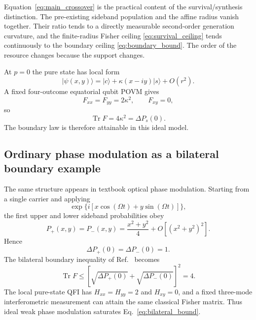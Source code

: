 \documentclass[aps,pra,reprint,superscriptaddress,longbibliography]{revtex4-2}
\newcommand{\Tr}{\operatorname{Tr}}
\begin{document}
Equation~\eqref{eq:main_crossover} is the practical content of the survival/synthesis distinction. The pre-existing sideband population and the affine radius vanish together. Their ratio tends to a directly measurable second-order generation curvature, and the finite-radius Fisher ceiling \eqref{eq:survival_ceiling} tends continuously to the boundary ceiling \eqref{eq:boundary_bound}. The order of the resource changes because the support changes.

At $p=0$ the pure state has local form
\begin{equation}
|\psi(x,y)\rangle
=|c\rangle+\kappa(x-iy)|s\rangle+O(r^2).
\end{equation}
A fixed four-outcome equatorial qubit POVM gives
\begin{equation}
F_{xx}=F_{yy}=2\kappa^2,
\qquad F_{xy}=0,
\end{equation}
so
\begin{equation}
\Tr F=4\kappa^2=\Delta P_s(0).
\end{equation}
The boundary law is therefore attainable in this ideal model.

\subsection{Ordinary phase modulation as a bilateral boundary example}

The same structure appears in textbook optical phase modulation. Starting from a single carrier and applying
\begin{equation}
\exp\{i[x\cos(\Omega t)+y\sin(\Omega t)]\},
\end{equation}
the first upper and lower sideband probabilities obey
\begin{equation}
P_+(x,y)=P_-(x,y)=\frac{x^2+y^2}{4}+O[(x^2+y^2)^2].
\end{equation}
Hence
\begin{equation}
\Delta P_+(0)=\Delta P_-(0)=1.
\end{equation}
The bilateral boundary inequality of Ref.~\cite{CompanionTwoRegimes2026} becomes
\begin{equation}
\boxed{
\Tr F\le
\left[\sqrt{\Delta P_+(0)}+\sqrt{\Delta P_-(0)}\right]^2=4.}
\label{eq:bilateral_bound}
\end{equation}
The local pure-state QFI has $H_{xx}=H_{yy}=2$ and $H_{xy}=0$, and a fixed three-mode interferometric measurement can attain the same classical Fisher matrix. Thus ideal weak phase modulation saturates Eq.~\eqref{eq:bilateral_bound}.
\end{document}
